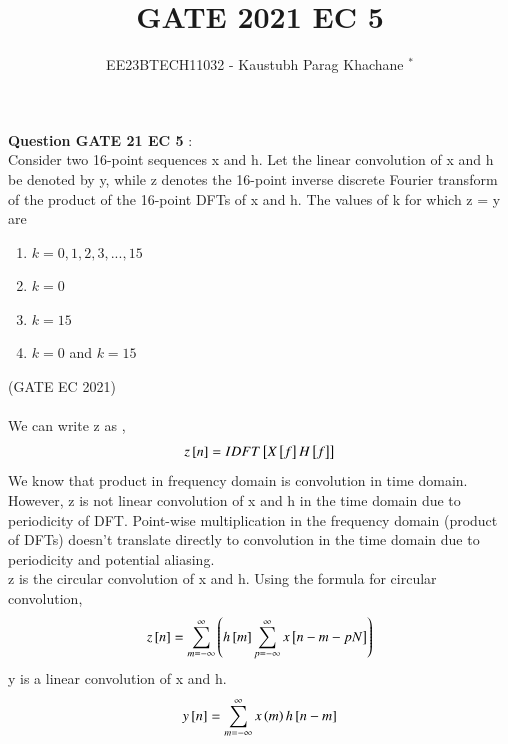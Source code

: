 \documentclass[journal,12pt,twocolumn]{IEEEtran}
\theoremstyle{remark}
\begin{document}

\vspace{3cm}

\Large\title{GATE 2021 EC 5}
\large\author{EE23BTECH11032 - Kaustubh Parag Khachane $^{*}$%
}
\maketitle
\newpage
\bigskip

\renewcommand{\thefigure}{\theenumi}
\renewcommand{\thetable}{\theenumi}
\large\textbf{Question GATE 21 EC 5} :\\
Consider two 16-point sequences x and h. Let the linear convolution of x and h be denoted by y, while z denotes the 16-point inverse discrete Fourier transform  of the product of the 16-point DFTs of x and h. The values of k for which z = y are 
\begin{enumerate}
    \item $k = 0, 1, 2, 3, ... , 15$
    \item $k = 0$
    \item $k = 15$
    \item $k = 0$ and $k = 15$
\end{enumerate}
\hfill(GATE EC 2021)\\
\solution\\

We can write z as ,
\begin{align}
    z{}\left[n\right] = IDFT{}\left[X{}\left[f\right]H{}\left[f\right]\right]
\end{align}
We know that product in frequency domain is convolution in time domain. However, z is not linear convolution of x and h in the time domain due to periodicity of DFT. Point-wise multiplication in the frequency domain (product of DFTs) doesn't translate directly to convolution in the time domain due to periodicity and potential aliasing.\\
z is the circular convolution of x and h. Using the formula for circular convolution,
\begin{align}
    z{}\left[n\right] = \sum_{m = -\infty}^{\infty}\left(h{}\left[m\right] \sum_{p = -\infty}^{\infty}x{}\left[n - m -pN\right]\right) \label{eq:eq1_g21ec5}
\end{align}
y is a linear convolution of x and h.
\begin{align}
    y{}\left[n\right] = \sum_{m = -\infty}^{\infty} x\left(m\right) h{}\left[n-m\right]
\end{align}
\end{document}
